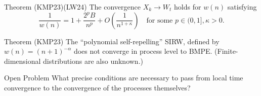 \documentclass{if-beamer}
\begin{document}
\begin{frame}
    \begin{block}{Theorem (KMP23)(LW24)}
        The convergence $X_k \to W_t$ holds for $w(n)$ satisfying
        \begin{equation*}
            \frac{1}{w(n)}=1+\frac{2^p B}{n^p}+O\left(\frac{1}{n^{1+\kappa}}\right) \quad \text{for some } p\in (0, 1], \kappa>0
        .\end{equation*}
    \end{block}
    \begin{block}{Theorem (KMP23)}
        The ``polynomial self-repelling'' SIRW, defined by
            $w(n)=(n+1)^{-\alpha}$
        does not converge in process level to BMPE. 
        (Finite-dimensional distributions are also unknown.)
    \end{block}
    \begin{exampleblock}{Open Problem}
        What precise conditions are necessary to pass from local time convergence to the convergence of the processes themselves?
    \end{exampleblock}
\end{frame}


\end{document}
